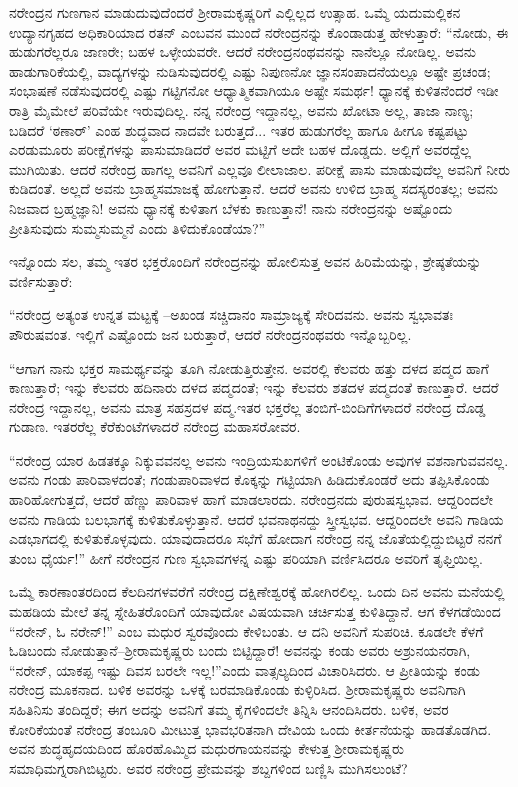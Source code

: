 ನರೇಂದ್ರನ ಗುಣಗಾನ ಮಾಡುದುವುದೆಂದರೆ ಶ್ರೀರಾಮಕೃಷ್ಣರಿಗೆ ಎಲ್ಲಿಲ್ಲದ ಉತ್ಸಾಹ. ಒಮ್ಮೆ ಯದುಮಲ್ಲಿಕನ ಉದ್ಯಾನಗೃಹದ ಅಧಿಕಾರಿಯಾದ ರತನ್ ಎಂಬವನ ಮುಂದೆ ನರೇಂದ್ರನನ್ನು ಕೊಂಡಾಡುತ್ತ ಹೇಳುತ್ತಾರೆ: “ನೋಡು, ಈ ಹುಡುಗರೆಲ್ಲರೂ ಜಾಣರೇ; ಬಹಳ ಒಳ್ಳೇಯವರೇ. ಆದರೆ ನರೇಂದ್ರನಂಥವನನ್ನು ನಾನೆಲ್ಲೂ ನೋಡಿಲ್ಲ. ಅವನು ಹಾಡುಗಾರಿಕೆಯಲ್ಲಿ, ವಾದ್ಯಗಳನ್ನು ನುಡಿಸುವುದರಲ್ಲಿ ಎಷ್ಟು ನಿಪುಣನೋ ಜ್ಞಾನಸಂಪಾದನೆಯಲ್ಲೂ ಅಷ್ಟೇ ಪ್ರಚಂಡ; ಸಂಭಾಷಣೆ ನಡೆಸುವುದರಲ್ಲಿ ಎಷ್ಟು ಗಟ್ಟಿಗನೋ ಆಧ್ಯಾತ್ಮಿಕವಾಗಿಯೂ ಅಷ್ಟೇ ಸಮರ್ಥ! ಧ್ಯಾನಕ್ಕೆ ಕುಳಿತನೆಂದರೆ ಇಡೀ ರಾತ್ರಿ ಮೈಮೇಲೆ ಪರಿವೆಯೇ ಇರುವುದಿಲ್ಲ. ನನ್ನ ನರೇಂದ್ರ ಇದ್ದಾನಲ್ಲ, ಅವನು ಖೋಟಾ ಅಲ್ಲ, ತಾಜಾ ನಾಣ್ಯ; ಬಡಿದರೆ ‘ಠಣಾರ್’ ಎಂಹ ಶುದ್ಧವಾದ ನಾದವೇ ಬರುತ್ತದೆ... ಇತರ ಹುಡುಗರೆಲ್ಲ ಹಾಗೂ ಹೀಗೂ ಕಷ್ಟಪಟ್ಟು ಎರಡುಮೂರು ಪರೀಕ್ಷೆಗಳನ್ನು ಪಾಸುಮಾಡಿದರೆ ಅವರ ಮಟ್ಟಿಗೆ ಅದೇ ಬಹಳ ದೊಡ್ಡದು. ಅಲ್ಲಿಗೆ ಅವರದ್ದೆಲ್ಲ ಮುಗಿಯಿತು. ಆದರೆ ನರೇಂದ್ರ ಹಾಗಲ್ಲ ಅವನಿಗೆ ಎಲ್ಲವೂ ಲೀಲಾಜಾಲ. ಪರೀಕ್ಷೆ ಪಾಸು ಮಾಡುವುದೆಲ್ಲ ಅವನಿಗೆ ನೀರು ಕುಡಿದಂತೆ. ಅಲ್ಲದೆ ಅವನು ಬ್ರಾಹ್ಮಸಮಾಜಕ್ಕೆ ಹೋಗುತ್ತಾನೆ. ಆದರೆ ಅವನು ಉಳಿದ ಬ್ರಾಹ್ಮ ಸದಸ್ಯರಂತಲ್ಲ; ಅವನು ನಿಜವಾದ ಬ್ರಹ್ಮಜ್ಞಾನಿ! ಅವನು ಧ್ಯಾನಕ್ಕೆ ಕುಳಿತಾಗ ಬೆಳಕು ಕಾಣುತ್ತಾನೆ! ನಾನು ನರೇಂದ್ರನನ್ನು ಅಷ್ಟೊಂದು ಪ್ರೀತಿಸುವುದು ಸುಮ್ಮಸುಮ್ಮನೆ ಎಂದು ತಿಳಿದುಕೊಂಡೆಯಾ?”

ಇನ್ನೊಂದು ಸಲ, ತಮ್ಮ ಇತರ ಭಕ್ತರೊಂದಿಗೆ ನರೇಂದ್ರನನ್ನು ಹೋಲಿಸುತ್ತ ಅವನ ಹಿರಿಮೆಯನ್ನು, ಶ್ರೇಷ್ಠತೆಯನ್ನು ವರ್ಣಿಸುತ್ತಾರೆ:

“ನರೇಂದ್ರ ಅತ್ಯಂತ ಉನ್ನತ ಮಟ್ಟಕ್ಕೆ –ಅಖಂಡ ಸಚ್ಚಿದಾನಂ ಸಾಮ್ರಾಜ್ಯಕ್ಕೆ ಸೇರಿದವನು. ಅವನು ಸ್ವಭಾವತಃ ಪೌರುಷವಂತ. ಇಲ್ಲಿಗೆ ಎಷ್ಟೊಂದು ಜನ ಬರುತ್ತಾರೆ, ಆದರೆ ನರೇಂದ್ರನಂಥವರು ಇನ್ನೊಬ್ಬರಿಲ್ಲ.

“ಆಗಾಗ ನಾನು ಭಕ್ತರ ಸಾಮರ್ಥ್ಯವನ್ನು ತೂಗಿ ನೋಡುತ್ತಿರುತ್ತೇನ. ಅವರಲ್ಲಿ ಕೆಲವರು ಹತ್ತು ದಳದ ಪದ್ಮದ ಹಾಗೆ ಕಾಣುತ್ತಾರೆ; ಇನ್ನು ಕೆಲವರು ಹದಿನಾರು ದಳದ ಪದ್ಮದಂತೆ; ಇನ್ನು ಕೆಲವರು ಶತದಳ ಪದ್ಮದಂತೆ ಕಾಣುತ್ತಾರೆ. ಆದರೆ ನರೇಂದ್ರ ಇದ್ದಾನಲ್ಲ, ಅವನು ಮಾತ್ರ ಸಹಸ್ರದಳ ಪದ್ಮ.ಇತರ ಭಕ್ತರೆಲ್ಲ ತಂಬಿಗೆ-ಬಿಂದಿಗೆಗಳಾದರೆ ನರೇಂದ್ರ ದೊಡ್ಡ ಗುಡಾಣ. ಇತರರೆಲ್ಲ ಕೆರೆಕುಂಟೆಗಳಾದರೆ ನರೇಂದ್ರ ಮಹಾಸರೋವರ.

“ನರೇಂದ್ರ ಯಾರ ಹಿಡತಕ್ಕೂ ನಿಕ್ಕುವವನಲ್ಲ ಅವನು ಇಂದ್ರಿಯಸುಖಗಳಿಗೆ ಅಂಟಿಕೊಂಡು ಅವುಗಳ ವಶನಾಗುವವನಲ್ಲ. ಅವನು ಗಂಡು ಪಾರಿವಾಳದಂತೆ; ಗಂಡುಪಾರಿವಾಳದ ಕೊಕ್ಕನ್ನು ಗಟ್ಟಿಯಾಗಿ ಹಿಡಿದುಕೊಂಡರೆ ಅದು ತಪ್ಪಿಸಿಕೊಂಡು ಹಾರಿಹೋಗುತ್ತದೆ, ಆದರೆ ಹೆಣ್ಣು ಪಾರಿವಾಳ ಹಾಗೆ ಮಾಡಲಾರದು. ನರೇಂದ್ರನದು ಪುರುಷಸ್ವಭಾವ. ಆದ್ದರಿಂದಲೇ ಅವನು ಗಾಡಿಯ ಬಲಭಾಗಕ್ಕೆ ಕುಳಿತುಕೊಳ್ಳುತ್ತಾನೆ. ಆದರೆ ಭವನಾಥನದ್ದು ಸ್ತ್ರೀಸ್ವಭವ. ಆದ್ದರಿಂದಲೇ ಅವನಿ ಗಾಡಿಯ ಎಡಭಾಗದಲ್ಲಿ ಕುಳಿತುಕೊಳ್ಳವುದು. ಯಾವುದಾದರೂ ಸಭೆಗೆ ಹೋದಾಗ ನರೇಂದ್ರ ನನ್ನ ಜೊತೆಯಲ್ಲಿದ್ದುಬಿಟ್ಟರೆ ನನಗೆ ತುಂಬ ಧೈರ್ಯ!” ಹೀಗೆ ನರೇಂದ್ರನ ಗುಣ ಸ್ವಭಾವಗಳನ್ನ ಎಷ್ಟು ಪರಿಯಾಗಿ ವರ್ಣಿಸಿದರೂ ಅವರಿಗೆ ತೃಫ್ತಿಯಿಲ್ಲ.

ಒಮ್ಮೆ ಕಾರಣಾಂತರದಿಂದ ಕೆಲದಿನಗಳವರೆಗೆ ನರೇಂದ್ರ ದಕ್ಷಿಣೇಶ್ವರಕ್ಕೆ ಹೋಗಿರಲಿಲ್ಲ. ಒಂದು ದಿನ ಅವನು ಮನೆಯಲ್ಲಿ ಮಹಡಿಯ ಮೇಲೆ ತನ್ನ ಸ್ನೇಹಿತರೊಂದಿಗೆ ಯಾವುದೋ ವಿಷಯವಾಗಿ ಚರ್ಚಿಸುತ್ತ ಕುಳಿತಿದ್ದಾನೆ. ಆಗ ಕೆಳಗಡೆಯಿಂದ “ನರೇನ್, ಓ ನರೇನ್!” ಎಂಬ ಮಧುರ ಸ್ವರವೊಂದು ಕೇಳಿಬಂತು. ಆ ದನಿ ಅವನಿಗೆ ಸುಪರಿಚಿ. ಕೂಡಲೇ ಕೆಳಗೆ ಓಡಿಬಂದು ನೋಡುತ್ತಾನೆ–ಶ್ರೀರಾಮಕೃಷ್ಣರು ಬಂದು ಬಿಟ್ಟಿದ್ದಾರೆ! ಅವನನ್ನು ಕಂಡು ಅವರು ಅಶ್ರುನಯನರಾಗಿ, “ನರೇನ್, ಯಾಕಪ್ಪ ಇಷ್ಟು ದಿವಸ ಬರಲೇ ಇಲ್ಲ!”ಎಂದು ವಾತ್ಸಲ್ಯದಿಂದ ವಿಚಾರಿಸಿದರು. ಆ ಪ್ರೀತಿಯನ್ನು ಕಂಡು ನರೇಂದ್ರ ಮೂಕನಾದ. ಬಳಿಕ ಅವರನ್ನು ಒಳಕ್ಕೆ ಬರಮಾಡಿಕೊಂಡು ಕುಳ್ಳಿರಿಸಿದ. ಶ್ರೀರಾಮಕೃಷ್ಣರು ಅವನಿಗಾಗಿ ಸಹಿತಿನಿಸು ತಂದಿದ್ದರೆ; ಈಗ ಅದನ್ನು ಅವನಿಗೆ ತಮ್ಮ ಕೈಗಳಿಂದಲೇ ತಿನ್ನಿಸಿ ಆನಂದಿಸಿದರು. ಬಳಿಕ, ಅವರ ಕೋರಿಕೆಯಂತೆ ನರೇಂದ್ರ ತಂಬೂರಿ ಮೀಟುತ್ತ ಭಾವಭರಿತನಾಗಿ ದೇವಿಯ ಒಂದು ಕೀರ್ತನೆಯನ್ನು ಹಾಡತೊಡಗಿದ. ಅವನ ಶುದ್ಧಹೃದಯದಿಂದ ಹೊರಹೊಮ್ಮಿದ ಮಧುರಗಾಯನವನ್ನು ಕೇಳುತ್ತ ಶ್ರೀರಾಮಕೃಷ್ಣರು ಸಮಾಧಿಮಗ್ನರಾಗಿಬಿಟ್ಟರು. ಅವರ ನರೇಂದ್ರ ಪ್ರೇಮವನ್ನು ಶಬ್ದಗಳಿಂದ ಬಣ್ಣಿಸಿ ಮುಗಿಸಲುಂಟೆ?

